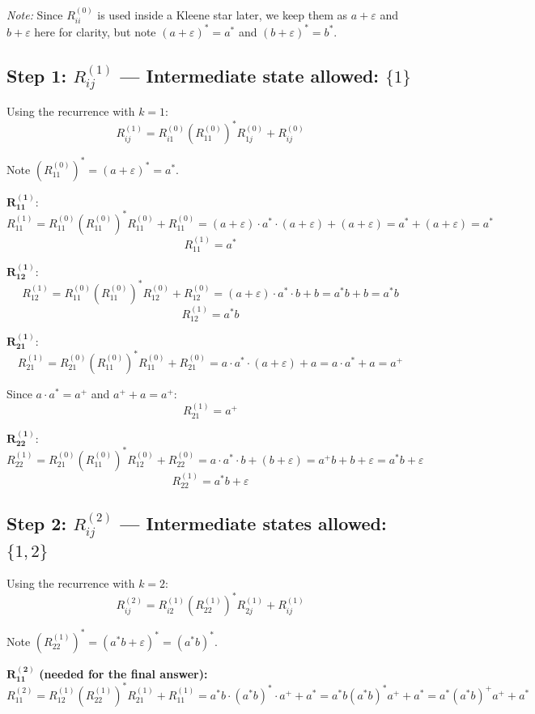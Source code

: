 \documentclass{article}
\theoremstyle{theorem}
\theoremstyle{definition}
\theoremstyle{remark}
\begin{document}
\medskip
\noindent\textit{Note:} Since $R^{(0)}_{ii}$ is used inside a Kleene star later, we keep them as $a+\varepsilon$ and $b+\varepsilon$ here for clarity, but note $(a+\varepsilon)^* = a^*$ and $(b+\varepsilon)^* = b^*$.

\subsection*{Step 1: $R^{(1)}_{ij}$ — Intermediate state allowed: $\{1\}$}

Using the recurrence with $k = 1$:
\[
R^{(1)}_{ij} = R^{(0)}_{i1}\left(R^{(0)}_{11}\right)^* R^{(0)}_{1j} + R^{(0)}_{ij}
\]

Note $(R^{(0)}_{11})^* = (a + \varepsilon)^* = a^*$.

\medskip
\noindent$\boldsymbol{R^{(1)}_{11}}$:
\[
R^{(1)}_{11} = R^{(0)}_{11}(R^{(0)}_{11})^* R^{(0)}_{11} + R^{(0)}_{11}
= (a+\varepsilon)\cdot a^* \cdot (a+\varepsilon) + (a+\varepsilon)
= a^* + (a+\varepsilon) = a^*
\]
\[
\boxed{R^{(1)}_{11} = a^*}
\]

\medskip
\noindent$\boldsymbol{R^{(1)}_{12}}$:
\[
R^{(1)}_{12} = R^{(0)}_{11}(R^{(0)}_{11})^* R^{(0)}_{12} + R^{(0)}_{12}
= (a+\varepsilon)\cdot a^* \cdot b + b
= a^*b + b = a^*b
\]
\[
\boxed{R^{(1)}_{12} = a^*b}
\]

\medskip
\noindent$\boldsymbol{R^{(1)}_{21}}$:
\[
R^{(1)}_{21} = R^{(0)}_{21}(R^{(0)}_{11})^* R^{(0)}_{11} + R^{(0)}_{21}
= a \cdot a^* \cdot (a+\varepsilon) + a
= a \cdot a^* + a = a^+
\]

Since $a \cdot a^* = a^+$ and $a^+ + a = a^+$:
\[
\boxed{R^{(1)}_{21} = a^+}
\]

\medskip
\noindent$\boldsymbol{R^{(1)}_{22}}$:
\[
R^{(1)}_{22} = R^{(0)}_{21}(R^{(0)}_{11})^* R^{(0)}_{12} + R^{(0)}_{22}
= a \cdot a^* \cdot b + (b+\varepsilon)
= a^+b + b + \varepsilon
= a^*b + \varepsilon
\]
\[
\boxed{R^{(1)}_{22} = a^*b + \varepsilon}
\]

\subsection*{Step 2: $R^{(2)}_{ij}$ — Intermediate states allowed: $\{1, 2\}$}

Using the recurrence with $k = 2$:
\[
R^{(2)}_{ij} = R^{(1)}_{i2}\left(R^{(1)}_{22}\right)^* R^{(1)}_{2j} + R^{(1)}_{ij}
\]

Note $(R^{(1)}_{22})^* = (a^*b + \varepsilon)^* = (a^*b)^*$.

\medskip
\noindent$\boldsymbol{R^{(2)}_{11}}$ \textbf{(needed for the final answer):}
\[
R^{(2)}_{11} = R^{(1)}_{12}(R^{(1)}_{22})^* R^{(1)}_{21} + R^{(1)}_{11}
= a^*b \cdot (a^*b)^* \cdot a^+ + a^*
= a^*b(a^*b)^* a^+ + a^*
= a^*(a^*b)^+ a^+ + a^*
\]
\end{document}
